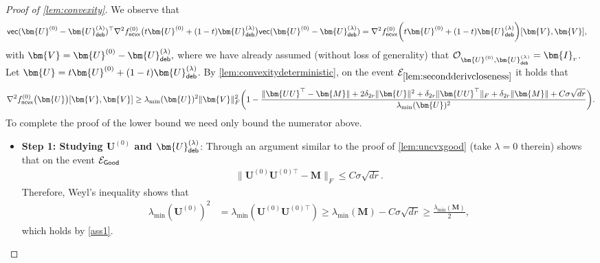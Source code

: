 \documentclass[10pt]{article}
\renewcommand{\t}{^{\top}}
\theoremstyle{definition}
\begin{document}
\begin{proof}[Proof of \cref{lem:convexity}]
We observe that 
\begin{align}
    {\sf vec}(\bm{U}^{(0)} - \bm{U}_{{\sf deb}}^{(\lambda)} )\t \nabla^2 f^{(0)}_{{\sf ncvx}}\big( t \bm{U}^{(0)} + (1 - t) \bm{U}^{(\lambda)}_{{\sf deb}} \big){\sf vec}(\bm{U}^{(0)} - \bm{U}_{{\sf deb}}^{(\lambda)} ) &= \nabla^2 f^{(0)}_{{\sf ncvx}} \bigg( t \bm{U}^{(0)} + (1-t) \bm{U}_{{\sf deb}}^{(\lambda)} \bigg)[ \bm{V}, \bm{V}],
\end{align}
with $\bm{V} = \bm{U}^{(0)} - \bm{U}_{{\sf deb}}^{(\lambda)},$ where we have already assumed (without loss of generality) that $\mathcal{O}_{\bm{U}^{(0)}, \bm{U}_{{\sf deb}}^{(\lambda)}} = \bm{I}_r$.  Let $\bm{U} = t \bm{U}^{(0)} + (1 - t) \bm{U}^{(\lambda)}_{{\sf deb}}$. By \cref{lem:convexitydeterministic}, on the event $\mathcal{E}_{\cref{lem:secondderivcloseness}}$ it holds that
\begin{align}
     \nabla^2 f^{(0)}_{{\sf ncvx}} \big( \bm{U} \big)[ \bm{V}, \bm{V}] \geq \lambda_{\min}(\bm{U})^2\| \bm{V}\|_F^2 \bigg( 1  - \frac{\| \bm{UU}\t - \bm{M}\| + 2 \delta_{2r} \|\bm{U}\|^2 + \delta_{2r} \| \bm{UU}\t \|_F + \delta_{2r} \| \bm{M} \| + C \sigma \sqrt{dr}}{\lambda_{\min}(\bm{U})^2} \bigg).
\end{align}
To complete the proof of the lower bound we need only bound the numerator above.  
\begin{itemize}
    \item \textbf{Step 1: Studying $\bm{U}^{(0)}$ and $\bm{U}_{{\sf deb}}^{(\lambda)}$}: Through an argument similar to the proof of \cref{lem:uncvxgood} (take $\lambda = 0$ therein) shows that on the event $\mathcal{E}_{{\sf Good}}$
\begin{align}
    \| \bm{U}^{(0)} \bm{U}^{(0)\top} - \bm{M} \|_F \leq C \sigma \sqrt{dr}.
\end{align}
Therefore, Weyl's inequality shows that
\begin{align}
    \lambda_{\min}(\bm{U}^{(0)})^2 &= \lambda_{\min}(\bm{U}^{(0)} \bm{U}^{(0)\top}) \geq \lambda_{\min}(\bm{M}) - C \sigma \sqrt{dr} \geq \frac{\lambda_{\min}(\bm{M})}{2},
\end{align}
which holds by \cref{ass1}.  


\end{itemize}
\end{proof}
\end{document}
